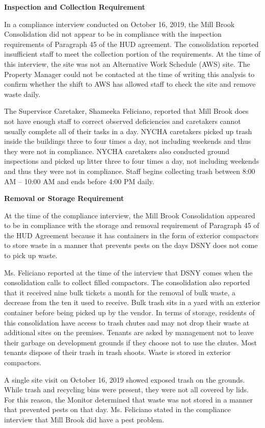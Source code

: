 

\textbf{Inspection and Collection Requirement} 

In a compliance interview conducted on October 16, 2019, the Mill Brook Consolidation did not appear to be in compliance with the inspection requirements of Paragraph 45 of the HUD agreement. The consolidation reported insufficient staff to meet the collection portion of the requirements. At the time of this interview, the site was not an Alternative Work Schedule (AWS) site. The Property Manager could not be contacted at the time of writing this analysis to confirm whether the shift to AWS has allowed staff to check the site and remove waste daily.

The Supervisor Caretaker, Shameeka Feliciano, reported that Mill Brook does not have enough staff to correct observed deficiencies and caretakers cannot usually complete all of their tasks in a day. NYCHA caretakers picked up trash inside the buildings three to four times a day, not including weekends and thus they were not in compliance. NYCHA caretakers also conducted ground inspections and picked up litter three to four times a day, not including weekends and thus they were not in compliance. Staff begins collecting trash between 8:00 AM -- 10:00 AM and ends before 4:00 PM daily.

\textbf{Removal or Storage Requirement}

At the time of the compliance interview, the Mill Brook Consolidation appeared to be in compliance with the storage and removal requirement of Paragraph 45 of the HUD Agreement because it has containers in the form of exterior compactors to store waste in a manner that prevents pests on the days DSNY does not come to pick up waste.

Ms. Feliciano reported at the time of the interview that DSNY comes when the consolidation calls to collect filled compactors. The consolidation also reported that it received nine bulk tickets a month for the removal of bulk waste, a decrease from the ten it used to receive. Bulk trash sits in a yard with an exterior container before being picked up by the vendor. In terms of storage, residents of this consolidation have access to trash chutes and may not drop their waste at additional sites on the premises. Tenants are asked by management not to leave their garbage on development grounds if they choose not to use the chutes. Most tenants dispose of their trash in trash shoots. Waste is stored in exterior compactors.

A single site visit on October 16, 2019 showed exposed trash on the grounds. While trash and recycling bins were present, they were not all covered by lids. For this reason, the Monitor determined that waste was not stored in a manner that prevented pests on that day. Ms. Feliciano stated in the compliance interview that Mill Brook did have a pest problem.

